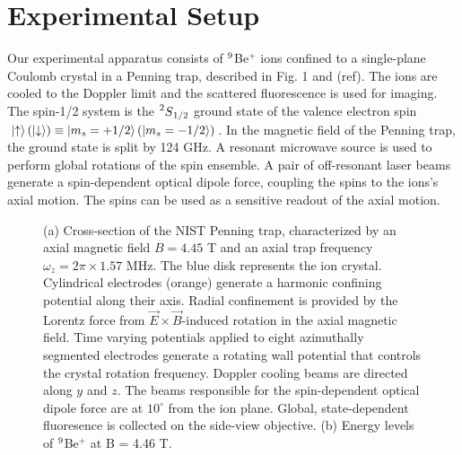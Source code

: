 \documentclass[aps,prl,twocolumn,groupedaddress]{revtex4-1}
\begin{document}
\section{Experimental Setup}
Our experimental apparatus consists of $\prescript{9}{}{}$Be$^{+}$ ions confined to a single-plane Coulomb crystal in a Penning trap, described in Fig. 1 and (ref). The ions are cooled to the Doppler limit and the scattered fluorescence is used for imaging. The spin-1/2 system is the $\prescript{2}{}{S}_{1/2}$ ground state of the valence electron spin $\ket{\uparrow} (\ket{\downarrow}) \equiv \ket{m_{s}=+1/2} (\ket{m_{s}=-1/2}) $. In the magnetic field of the Penning trap, the ground state is split by 124 GHz. A resonant microwave source is used to perform global rotations of the spin ensemble. A pair of off-resonant laser beams generate a spin-dependent optical dipole force, coupling the spins to the ions's axial motion. The spins can be used as a sensitive readout of the axial motion.
\begin{figure}
  \hfill
  \hfill
  \caption{(a) Cross-section of the NIST Penning trap, characterized by an axial magnetic field $B = 4.45$ T and an axial trap frequency $\omega_z = 2\pi \times 1.57$ MHz. The blue disk represents the ion crystal. Cylindrical electrodes (orange) generate a harmonic confining potential along their axis. Radial confinement is provided by the Lorentz force from $\vec{E} \times \vec{B}$-induced rotation in the axial magnetic field. Time varying potentials applied to eight azimuthally segmented electrodes generate a rotating wall potential that controls the crystal rotation frequency. Doppler cooling beams are directed along $y$ and $z$. The beams responsible for the spin-dependent optical dipole force are at $10^{\circ} $ from the ion plane. Global, state-dependent fluoresence is collected on the side-view objective. (b) Energy levels of $\prescript{9}{}{}$Be$^{+}$ at B = 4.46 T.}\label{Fig 1}
\end{figure}
\end{document}
